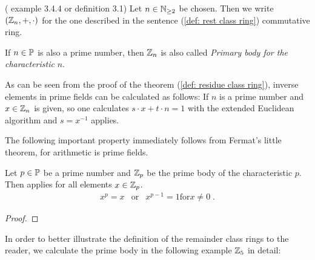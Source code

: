 \begin{definition}  (\cite{JB} example 3.4.4 or \cite{AL} definition 3.1)
Let $ n \in \mathbb{N} _{\geq 2} $ be chosen. Then we write $ (\mathbb{Z}_n, +, \cdot) $ for the one described in the sentence (\ref{def: rest class ring}) commutative ring.

If $ n \in \mathbb{P} $ is also a prime number, then $ \mathbb{Z}_n $ is also called
\textit{Primary body for the characteristic} $ n $.
\end{definition}
\begin{remark} As can be seen from the proof of the theorem (\ref{def: residue class ring}), inverse elements in prime fields can be calculated as follows: If $ n $ is a prime number and $ x \in \mathbb{Z}_n $ is given, so one calculates $ s \cdot x + t \cdot n = 1 $ with the extended Euclidean algorithm and $ s = x ^{- 1} $ applies.
\end{remark}
The following important property immediately follows from Fermat's little theorem, for arithmetic is prime fields.
\begin{lemma}
\label{lemma: klein_satz_fermat}
Let $ p \in \mathbb{P} $ be a prime number and $ \mathbb{Z}_p $ be the prime body of the characteristic $ p $. Then applies
for all elements $ x \in \mathbb{Z}_p $.
\begin{equation}
\begin{array}{ccc}
x^p = x & \text{or} & x^{p-1} = 1 \text{for} x \neq 0 \;.
\end{array}
\end{equation}
\end{lemma}
\begin{proof}
\end{proof}
In order to better illustrate the definition of the remainder class rings to the reader, we calculate the prime body in the following example
$ \mathbb{Z}_5 $ in detail:
